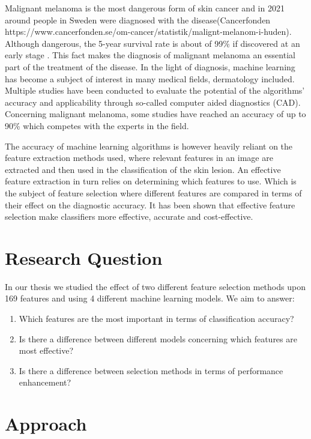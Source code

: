 \documentclass{kththesis}
\begin{document}
Malignant melanoma is the most dangerous form of skin cancer and in 2021 around people in Sweden were diagnosed with the disease(Cancerfonden https://www.cancerfonden.se/om-cancer/statistik/malignt-melanom-i-huden). Although dangerous, the 5-year survival rate is about of 99\% if discovered at an early stage \parencite{skincancer_org_2019}.
This fact makes the diagnosis of malignant melanoma an essential part of the treatment of the disease. In the light of diagnosis, machine learning has become a subject of interest in many medical fields, dermatology included. Multiple studies have been conducted to evaluate the potential of the algorithms’ accuracy and applicability through so-called computer aided diagnostics (CAD). Concerning malignant melanoma, some studies have reached an accuracy of up to 90\% which competes with the experts in the field. %

The accuracy of machine learning algorithms is however heavily reliant on the feature extraction methods used, where relevant features in an image are extracted and then used in the classification of the skin lesion. An effective feature extraction in turn relies on determining which features to use. Which is the subject of feature selection where different features are compared in terms of their effect on the diagnostic accuracy. It has been shown that effective feature selection make classifiers more effective, accurate and cost-effective. \parencite{KarabulutEsraMahsereci2012Acso}

\section{Research Question}
In our thesis we studied the effect of two different feature selection methods upon 169 features and using 4 different machine learning models. We aim to answer: %
\begin{enumerate}
    \item Which features are the most important in terms of classification accuracy?
    \item Is there a difference between different models concerning which features are most effective?
    \item Is there a difference between selection methods in terms of performance enhancement?
\end{enumerate}

\section{Approach}
\end{document}

